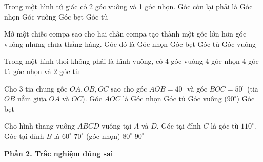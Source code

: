 \begin{ex} %
Trong một hình tứ giác có 2 góc vuông và 1 góc nhọn. Góc còn lại phải là
\choice
{Góc nhọn}
{Góc vuông}
{Góc bẹt}
{\True Góc tù}
\end{ex}

\begin{ex} %
Mở một chiếc compa sao cho hai chân compa tạo thành một góc lớn hơn góc vuông nhưng chưa thẳng hàng. Góc đó là
\choice
{Góc nhọn}
{Góc bẹt}
{\True Góc tù}
{Góc vuông}
\end{ex}

\begin{ex} %
Trong một hình thoi không phải là hình vuông, có
\choice
{4 góc vuông}
{4 góc nhọn}
{4 góc tù}
{ góc nhọn và 2 góc tù}
\end{ex}

\begin{ex} %
Cho 3 tia chung gốc $OA, OB, OC$ sao cho góc $AOB = 40^\circ$ và góc $BOC = 50^\circ$ (tia $OB$ nằm giữa $OA$ và $OC$). Góc $AOC$ là
\choice
{Góc nhọn}
{Góc tù}
{\True Góc vuông ($90^\circ$)}
{Góc bẹt}
\end{ex}

\begin{ex} %
Cho hình thang vuông $ABCD$ vuông tại $A$ và $D$. Góc tại đỉnh $C$ là góc tù $110^\circ$. Góc tại đỉnh $B$ là
\choice
{$60^\circ$}
{\True $70^\circ$ (góc nhọn)}
{$80^\circ$}
{$90^\circ$}
\end{ex}

\textbf{Phần 2. Trắc nghiệm đúng sai}

